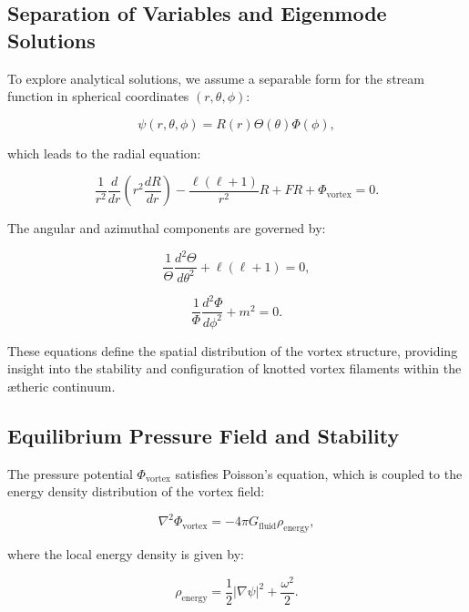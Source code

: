\documentclass[a4paper,10pt]{article}
\begin{document}
\subsection{Separation of Variables and Eigenmode Solutions}
To explore analytical solutions, we assume a separable form for the stream function in spherical coordinates $(r, \theta, \phi)$:

\begin{equation*}
\psi(r, \theta, \phi) = R(r) \Theta(\theta) \Phi(\phi),
\end{equation*}

which leads to the radial equation:

\begin{equation*}
\frac{1}{r^2} \frac{d}{dr} \left( r^2 \frac{dR}{dr} \right) - \frac{\ell (\ell+1)}{r^2} R + F R + \Phi_\text{vortex} = 0.
\end{equation*}

The angular and azimuthal components are governed by:

\begin{equation*}
\frac{1}{\Theta} \frac{d^2\Theta}{d\theta^2} + \ell(\ell+1) = 0,
\end{equation*}

\begin{equation*}
\frac{1}{\Phi} \frac{d^2\Phi}{d\phi^2} + m^2 = 0.
\end{equation*}

These equations define the spatial distribution of the vortex structure, providing insight into the stability and configuration of knotted vortex filaments within the ætheric continuum.

\subsection{Equilibrium Pressure Field and Stability}
The pressure potential $\Phi_\text{vortex}$ satisfies Poisson's equation, which is coupled to the energy density distribution of the vortex field:

\begin{equation*}
\nabla^2 \Phi_\text{vortex} = -4\pi G_\text{fluid} \rho_\text{energy},
\end{equation*}

where the local energy density is given by:

\begin{equation*}
\rho_\text{energy} = \frac{1}{2} |\nabla \psi|^2 + \frac{\omega^2}{2}.
\end{equation*}
\end{document}
